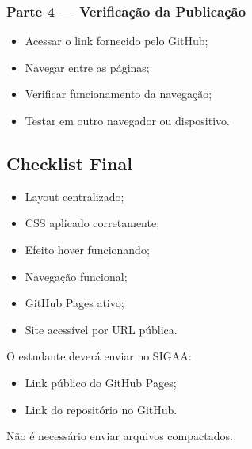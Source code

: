 \documentclass[12pt,a4paper]{article}
\begin{document}
        \subsubsection{Parte 4 — Verificação da Publicação}
            
            \begin{boxAtividade}
            
            \begin{itemize}
            \item Acessar o link fornecido pelo GitHub;
            \item Navegar entre as páginas;
            \item Verificar funcionamento da navegação;
            \item Testar em outro navegador ou dispositivo.
            \end{itemize}
            
            \end{boxAtividade}
        


\subsection{Checklist Final}

    \begin{boxAtividade}
    
    \begin{itemize}
    \item Layout centralizado;
    \item CSS aplicado corretamente;
    \item Efeito hover funcionando;
    \item Navegação funcional;
    \item GitHub Pages ativo;
    \item Site acessível por URL pública.
    \end{itemize}
    
    \end{boxAtividade}
    
    
    \begin{boxAtividade}
    
    O estudante deverá enviar no SIGAA:
    
    \begin{itemize}
    \item Link público do GitHub Pages;
    \item Link do repositório no GitHub.
    \end{itemize}
    
    Não é necessário enviar arquivos compactados.
    
    \end{boxAtividade}
\end{document}
